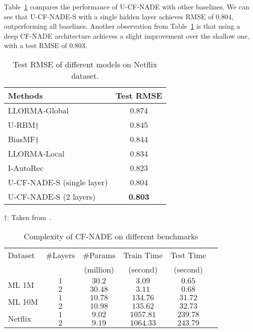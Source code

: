\documentclass{article}
\newcommand{\cfnade}{CF-NADE\xspace}
\begin{document}
 Table~\ref{tab:netflix} compares the performance of U-\cfnade with
 other baselines. We can see that U-{\cfnade}-S with a single
 hidden layer achieves RMSE of $0.804$, outperforming all
 baselines. Another observation from Table~\ref{tab:netflix} is that
 using a deep \cfnade architecture achieves a slight improvement over
 the shallow one, with a test RMSE of $0.803$.
 
 \begin{table}[h]
 \caption{Test RMSE of different models on Netflix dataset.}
 \label{tab:netflix}
 \begin{center}
 \begin{small}
 \begin{sc}
 \begin{tabular}{lc}
 \hline
 \abovespace\belowspace
 Methods & Test RMSE  \\
 \hline
 \abovespace
 LLORMA-Global~\citep{lee2013local} & 0.874\\
 U-RBM$\dagger$ & 0.845\\
 BiasMF$\dagger$ & 0.844 \\
 LLORMA-Local~\citep{lee2013local} & 0.834\\
 \belowspace
 I-AutoRec~\citep{sedhain2015autorec} & 0.823\\
 U-{\cfnade}-S (single layer) & 0.804\\
 U-{\cfnade}-S (2 layers) & {\bf 0.803}\\
 \hline
 \end{tabular}
 \end{sc}
 \end{small}
 \begin{minipage}{0.48\textwidth}
{\small
$\dagger$: Taken from~\citep{sedhain2015autorec}.
}
\end{minipage}
 \end{center}
 \end{table}
 
 \begin{table}[h]
\begin{small}
\centering
\caption{Complexity of \cfnade on different benchmarks}
\label{tab:complexity}
\begin{tabular}{@{}lccccc@{}}
\toprule
                Dataset & $\#$Layers & $\#$Params & Train Time & Test Time\\ 
                &&(million)&(second)&(second)\\ \midrule
\multirow{2}{*}{ML 1M} &  $1$   & $30.2$ &$3.09$   & $0.65$  \\
                  & $2$ & $30.48$ & $3.11$ & $0.68$ \\
\multirow{2}{*}{ML 10M} & $1$ & $10.78$ & $134.76$ & $31.72$ \\
                  & $2$ & $10.98$ & $135.62$ & $32.73$ \\
\multirow{2}{*}{Netflix} & $1$ & $9.02$  & $1057.81$ & $239.78$ \\
                  & $2$ & $9.19$ &  $1064.33$& $243.79$ \\ \bottomrule
\end{tabular}
\end{small}
\end{table}
\end{document}
